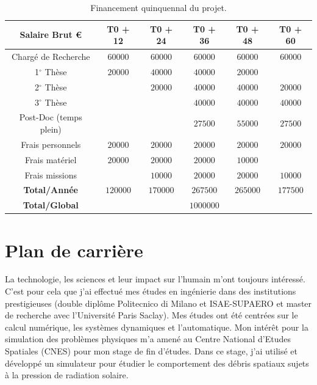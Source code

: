 \documentclass[12pt, french]{article}
\begin{document}
\begin{table}[h]
	\centering
	\begin{tabular}{|c|ccccc|}
		\hline
		Salaire Brut \euro & T0 + 12 & T0 + 24 & T0 + 36 & T0 + 48 & T0 + 60 \\
		\hline
		Chargé de Recherche & $60000$ & $60000$ & $60000$ & $60000$ & $60000$\\
		1$^\circ$ Thèse & $20000$ & $40000$ & $40000$ & $20000$ &  \\
		2$^\circ$ Thèse &  & $20000$ & $40000$ & $40000$ & $20000$ \\
		3$^\circ$ Thèse & &  & $40000$ & $40000$ & $40000$ \\
		Post-Doc (temps plein) &  & & $27500$ & $55000$ & $27500$ \\
		Frais personnels & $20000$ & $20000$ & $20000$ & $20000$ & $20000$ \\
		Frais matériel & $20000$ & $20000$ & $20000$ & $10000$ & \\
		Frais missions &  & $10000$ & $20000$ & $20000$ & $10000$\\
		\hline
		\textbf{Total/Année} & $120000$ & $170000$ & $267500$ & $265000$ & $177500$ \\
		\textbf{Total/Global} & \multicolumn{5}{c}{$1000000$} \\
		\hline
	\end{tabular}
\caption{Financement quinquennal du projet.}
\end{table}


	
	
	
	
	\section{Plan de carrière}
	
	La technologie, les sciences et leur impact sur l'humain m'ont toujours intéressé. C'est pour cela que j'ai effectué mes études en ingénierie dans des institutions prestigieuses (double diplôme Politecnico di Milano et ISAE-SUPAERO et master de recherche avec l'Université Paris Saclay). Mes études ont été centrées sur le calcul numérique, les systèmes dynamiques et l'automatique. Mon intérêt pour la simulation des problèmes physiques m'a amené au Centre National d'Etudes Spatiales (CNES) pour mon stage de fin d'études. Dans ce stage, j'ai utilisé et développé un simulateur pour étudier le comportement des débris spatiaux sujets à la pression de radiation solaire. \\
	
\end{document}

